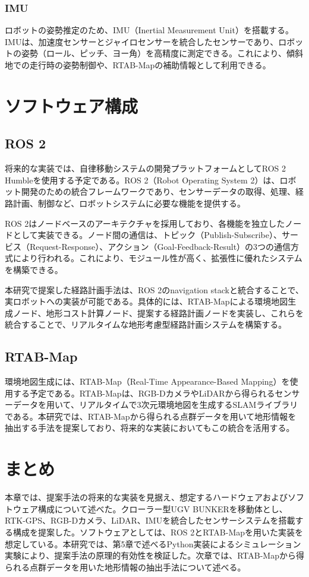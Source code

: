 \subsubsection{IMU}

ロボットの姿勢推定のため、IMU（Inertial Measurement Unit）を搭載する。IMUは、加速度センサーとジャイロセンサーを統合したセンサーであり、ロボットの姿勢（ロール、ピッチ、ヨー角）を高精度に測定できる。これにより、傾斜地での走行時の姿勢制御や、RTAB-Mapの補助情報として利用できる。

\section{ソフトウェア構成}

\subsection{ROS 2}

将来的な実装では、自律移動システムの開発プラットフォームとしてROS 2 Humbleを使用する予定である。ROS 2（Robot Operating System 2）は、ロボット開発のための統合フレームワークであり、センサーデータの取得、処理、経路計画、制御など、ロボットシステムに必要な機能を提供する。

ROS 2はノードベースのアーキテクチャを採用しており、各機能を独立したノードとして実装できる。ノード間の通信は、トピック（Publish-Subscribe）、サービス（Request-Response）、アクション（Goal-Feedback-Result）の3つの通信方式により行われる。これにより、モジュール性が高く、拡張性に優れたシステムを構築できる。

本研究で提案した経路計画手法は、ROS 2のnavigation stackと統合することで、実ロボットへの実装が可能である。具体的には、RTAB-Mapによる環境地図生成ノード、地形コスト計算ノード、提案する経路計画ノードを実装し、これらを統合することで、リアルタイムな地形考慮型経路計画システムを構築する。

\subsection{RTAB-Map}

環境地図生成には、RTAB-Map（Real-Time Appearance-Based Mapping）を使用する予定である。RTAB-Mapは、RGB-DカメラやLiDARから得られるセンサーデータを用いて、リアルタイムで3次元環境地図を生成するSLAMライブラリである。本研究では、RTAB-Mapから得られる点群データを用いて地形情報を抽出する手法を提案しており、将来的な実装においてもこの統合を活用する。

\section{まとめ}

本章では、提案手法の将来的な実装を見据え、想定するハードウェアおよびソフトウェア構成について述べた。クローラー型UGV BUNKERを移動体とし、RTK-GPS、RGB-Dカメラ、LiDAR、IMUを統合したセンサーシステムを搭載する構成を提案した。ソフトウェアとしては、ROS 2とRTAB-Mapを用いた実装を想定している。本研究では、第5章で述べるPython実装によるシミュレーション実験により、提案手法の原理的有効性を検証した。次章では、RTAB-Mapから得られる点群データを用いた地形情報の抽出手法について述べる。